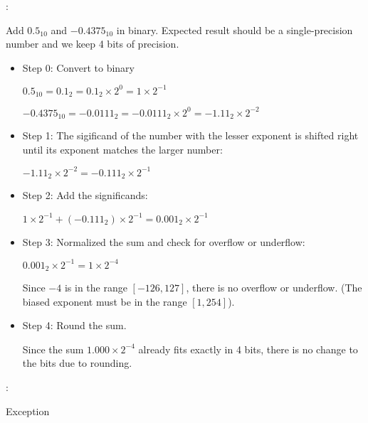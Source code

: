     \par {}:
      \par Add $0.5_{10}$ and $-0.4375_{10}$ in binary. Expected result should
        be a single-precision number and we keep 4 bits of precision.
      \begin{itemize}
        \item Step 0: Convert to binary
          \par $0.5_{10} = 0.1_{2} = 0.1_{2} \times 2^{0} = 1 \times 2^{-1}$
          \par $-0.4375_{10} = -0.0111_{2} = -0.0111_{2} \times 2^{0} =
            -1.11_{2} \times 2^{-2}$
        \item Step 1: The sigificand of the number with the lesser exponent is
          shifted right until its exponent matches the larger number:
          \par $-1.11_{2} \times 2^{-2} = -0.111_2 \times 2^{-1}$
        \item Step 2: Add the significands:
          \par $1 \times 2^{-1} + (-0.111_{2}) \times 2^{-1} = 0.001_{2} \times
            2^{-1}$
        \item Step 3: Normalized the sum and check for overflow or underflow:
          \par $0.001_{2} \times 2^{-1} = 1 \times 2^{-4}$
          \par Since $-4$ is in the range $[-126, 127]$, there is no overflow
          or underflow. (The biased exponent must be in the range $[1, 254]$).
        \item Step 4: Round the sum.
          \par Since the sum $1.000 \times 2^{-4}$ already fits exactly in 4
          bits, there is no change to the bits due to rounding.
      \end{itemize}

    \par {}:
    \begin{algorithm}[H]
      \begin{algorithmic}[1]
              \EndWhile
              \EndWhile
            \EndIf
              Exception
            \EndIf
            \State {}
          \EndWhile
        \EndFunction
      \end{algorithmic}
    \end{algorithm}

